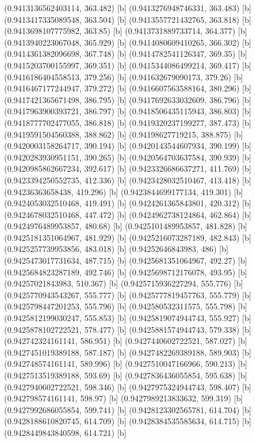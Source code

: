 {{{(0.9413136562403114, 363.482) [b] 
(0.9413276948746331, 363.483) [b] 
(0.9413417335089548, 363.504) [b] 
(0.9413557721432765, 363.818) [b] 
(0.9413698107775982, 363.85) [b] 
(0.9413731889733714, 364.377) [b] 
(0.9413940223067048, 365.929) [b] 
(0.9414080609410265, 366.302) [b] 
(0.9414361382096698, 367.748) [b] 
(0.9414782541126347, 369.35) [b] 
(0.9415203700155997, 369.351) [b] 
(0.9415344086499214, 369.417) [b] 
(0.9416186404558513, 379.256) [b] 
(0.941632679090173, 379.26) [b] 
(0.9416467177244947, 379.272) [b] 
(0.9416607563588164, 380.296) [b] 
(0.9417421365671498, 386.795) [b] 
(0.9417692633032609, 386.796) [b] 
(0.9417963900393721, 386.797) [b] 
(0.9418506435115943, 386.803) [b] 
(0.9418777702477055, 386.818) [b] 
(0.9419320237199277, 387.473) [b] 
(0.9419591504560388, 388.862) [b] 
(0.94198627719215, 388.875) [b] 
(0.9420003158264717, 390.194) [b] 
(0.9420143544607934, 390.199) [b] 
(0.9420283930951151, 390.265) [b] 
(0.9420564703637584, 390.939) [b] 
(0.9420985862667234, 392.617) [b] 
(0.9423326686637271, 411.769) [b] 
(0.9423394250552735, 412.336) [b] 
(0.9423428032510467, 413.418) [b] 
(0.94236363658438, 419.296) [b] 
(0.9423844699177134, 419.301) [b] 
(0.9424053032510468, 419.491) [b] 
(0.9424261365843801, 420.312) [b] 
(0.9424678032510468, 447.472) [b] 
(0.9424962738124864, 462.864) [b] 
(0.9424976489953857, 480.68) [b] 
(0.9425101489953857, 481.828) [b] 
(0.9425181351064967, 481.929) [b] 
(0.9425216073287189, 482.843) [b] 
(0.9425257739953856, 483.018) [b] 
(0.94252646843983, 486) [b] 
(0.9425473017731634, 487.715) [b] 
(0.9425681351064967, 492.27) [b] 
(0.9425684823287189, 492.746) [b] 
(0.9425698712176078, 493.95) [b] 
(0.94257021843983, 510.367) [b] 
(0.9425715936227294, 555.776) [b] 
(0.9425770943543267, 555.777) [b] 
(0.9425777819457763, 555.779) [b] 
(0.9425798447201253, 555.796) [b] 
(0.942580532311575, 555.798) [b] 
(0.9425812199030247, 555.853) [b] 
(0.9425819074944743, 555.927) [b] 
(0.9425878102722521, 578.477) [b] 
(0.9425881574944743, 579.338) [b] 
(0.942742324161141, 586.951) [b] 
(0.9427440602722521, 587.027) [b] 
(0.9427451019389188, 587.187) [b] 
(0.9427482269389188, 589.903) [b] 
(0.942748574161141, 589.996) [b] 
(0.9427510047166966, 590.213) [b] 
(0.9427513519389188, 593.69) [b] 
(0.9427836436055854, 595.638) [b] 
(0.9427940602722521, 598.346) [b] 
(0.9427975324944743, 598.407) [b] 
(0.942798574161141, 598.97) [b] 
(0.9427989213833632, 599.319) [b] 
(0.9427992686055854, 599.741) [b] 
(0.9428123302565781, 614.704) [b] 
(0.9428188610820745, 614.709) [b] 
(0.9428384535585634, 614.715) [b] 
(0.9428449843840598, 614.721) [b] 
}}}
